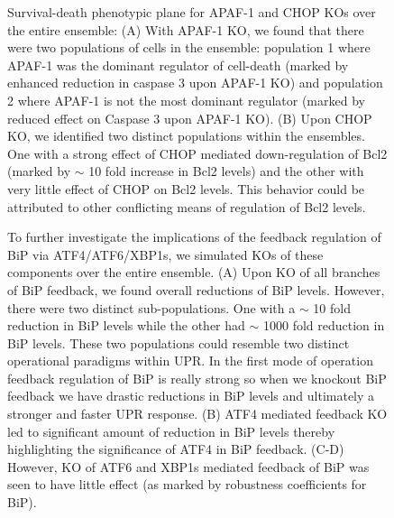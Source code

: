 \documentclass[fleqn,10pt]{wlscirep}
\begin{document}
\begin{figure}\centering
	\caption{Survival-death phenotypic plane for APAF-1 and CHOP KOs over the entire ensemble: (A) With APAF-1 KO, we found that there were two populations of cells in the ensemble: population 1 where APAF-1 was the dominant regulator of cell-death (marked by enhanced reduction in caspase 3 upon APAF-1 KO) and population 2 where APAF-1 is not the most dominant regulator (marked by reduced effect on Caspase 3 upon APAF-1 KO). (B) Upon CHOP KO, we identified two distinct populations within the ensembles. One with a strong effect of CHOP mediated down-regulation of Bcl2 (marked by $\sim$ 10 fold increase in Bcl2 levels) and the other with very little effect of CHOP on Bcl2 levels. This behavior could be attributed to other conflicting means of regulation of Bcl2 levels.}
	\label{fg:COUP_S1}
\end{figure}

\begin{figure}\centering
	\caption{To further investigate the implications of the feedback regulation of BiP via ATF4/ATF6/XBP1s, we simulated KOs of these components over the entire ensemble. (A) Upon KO of all branches of BiP feedback, we found overall reductions of BiP levels. However, there were two distinct sub-populations. One with a $\sim$ 10 fold reduction in BiP levels while the other had $\sim$ 1000 fold reduction in BiP levels. These two populations could resemble two distinct operational paradigms within UPR. In the first mode of operation feedback regulation of BiP is really strong so when we knockout BiP feedback we have drastic reductions in BiP levels and ultimately a stronger and faster UPR response. (B) ATF4 mediated feedback KO led to significant amount of reduction in BiP levels thereby highlighting the significance of ATF4 in BiP feedback. (C-D) However, KO of ATF6 and XBP1s mediated feedback of BiP was seen to have little effect (as marked by robustness coefficients for BiP).}
	\label{fg:COUP_S2}
\end{figure}

\clearpage


%

\end{document}
